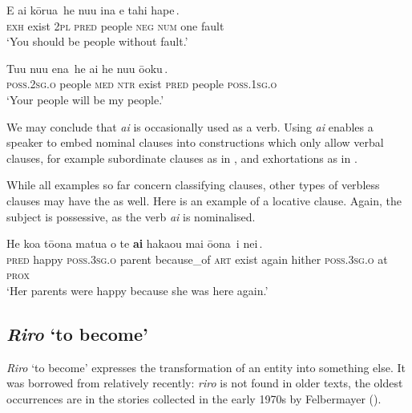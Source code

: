 \ea\label{ex:9.103}
\gll E ai {\ob}kōrua\,{\cb} {\ob}he nu{\ꞌ}u {\ꞌ}ina e tahi hape\,{\cb}. \\
\textsc{exh} exist {\db}\textsc{2pl} {\db}\textsc{pred} people \textsc{neg} \textsc{num} one fault \\

\glt 
‘You should be people without fault.’ \textstyleExampleref{[Mat. 5:48]}
\z

\ea\label{ex:9.104}
\gll {\ob}Tu{\ꞌ}u nu{\ꞌ}u ena\,{\cb} he ai {\ob}he nu{\ꞌ}u ō{\ꞌ}oku\,{\cb}. \\
{\db}\textsc{poss.2sg.o} people \textsc{med} \textsc{ntr} exist {\db}\textsc{pred} people \textsc{poss.1sg.o} \\

\glt
‘Your people will be my people.’ \textstyleExampleref{[Ruth 1:16]}
\z

We may conclude that \textit{ai} is occasionally used as a  verb. Using \textit{ai} enables a speaker to embed nominal clauses into constructions which only allow verbal clauses, for example subordinate clauses as in , and exhortations as in .

While all examples so far concern classifying clauses, other types of verbless clauses may have the  as well. Here is an example of a locative clause. Again, the subject is possessive, as the verb \textit{ai} is nominalised. 

\ea\label{ex:9.105}
\gll He koa tō{\ꞌ}ona matu{\ꞌ}a {\ꞌ}o te \textbf{ai} haka{\ꞌ}ou mai {\ob}ō{\ꞌ}ona\,{\cb} {\ob}{\ꞌ}i nei\,{\cb}.\\
\textsc{pred} happy \textsc{poss.3sg.o} parent because\_of \textsc{art} exist again hither {\db}\textsc{poss.3sg.o} {\db}at \textsc{prox}\\

\glt 
‘Her parents were happy because she was here again.’ \textstyleExampleref{[R441.018]}
\z

\subsection{\textit{Riro} ‘to become’}\label{sec:9.6.2}
\textit{Riro} ‘to become’ expresses the transformation of an entity into something else. It was borrowed from  relatively recently: \textit{riro} is not found in older texts, the oldest occurrences are in the stories collected in the early 1970s by Felbermayer (\citealt{Felbermayer1971,Felbermayer1973,Felbermayer1978}). 

